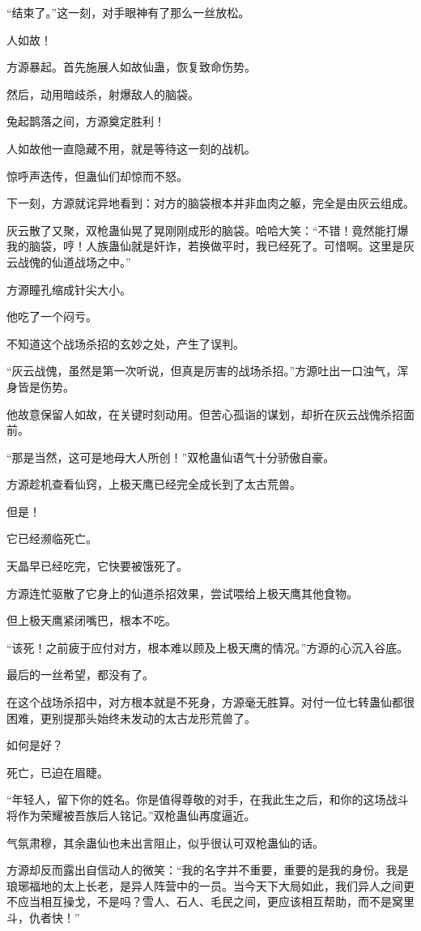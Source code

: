 \begin{this_body}
“结束了。”这一刻，对手眼神有了那么一丝放松。

人如故！

方源暴起。首先施展人如故仙蛊，恢复致命伤势。

然后，动用暗歧杀，射爆敌人的脑袋。

兔起鹊落之间，方源奠定胜利！

人如故他一直隐藏不用，就是等待这一刻的战机。

惊呼声迭传，但蛊仙们却惊而不怒。

下一刻，方源就诧异地看到：对方的脑袋根本并非血肉之躯，完全是由灰云组成。

灰云散了又聚，双枪蛊仙晃了晃刚刚成形的脑袋。哈哈大笑：“不错！竟然能打爆我的脑袋，哼！人族蛊仙就是奸诈，若换做平时，我已经死了。可惜啊。这里是灰云战傀的仙道战场之中。”

方源瞳孔缩成针尖大小。

他吃了一个闷亏。

不知道这个战场杀招的玄妙之处，产生了误判。

“灰云战傀，虽然是第一次听说，但真是厉害的战场杀招。”方源吐出一口浊气，浑身皆是伤势。

他故意保留人如故，在关键时刻动用。但苦心孤诣的谋划，却折在灰云战傀杀招面前。

“那是当然，这可是地母大人所创！”双枪蛊仙语气十分骄傲自豪。

方源趁机查看仙窍，上极天鹰已经完全成长到了太古荒兽。

但是！

它已经濒临死亡。

天晶早已经吃完，它快要被饿死了。

方源连忙驱散了它身上的仙道杀招效果，尝试喂给上极天鹰其他食物。

但上极天鹰紧闭嘴巴，根本不吃。

“该死！之前疲于应付对方，根本难以顾及上极天鹰的情况。”方源的心沉入谷底。

最后的一丝希望，都没有了。

在这个战场杀招中，对方根本就是不死身，方源毫无胜算。对付一位七转蛊仙都很困难，更别提那头始终未发动的太古龙形荒兽了。

如何是好？

死亡，已迫在眉睫。

“年轻人，留下你的姓名。你是值得尊敬的对手，在我此生之后，和你的这场战斗将作为荣耀被吾族后人铭记。”双枪蛊仙再度逼近。

气氛肃穆，其余蛊仙也未出言阻止，似乎很认可双枪蛊仙的话。

方源却反而露出自信动人的微笑：“我的名字并不重要，重要的是我的身份。我是琅琊福地的太上长老，是异人阵营中的一员。当今天下大局如此，我们异人之间更不应当相互操戈，不是吗？雪人、石人、毛民之间，更应该相互帮助，而不是窝里斗，仇者快！”


\end{this_body}
